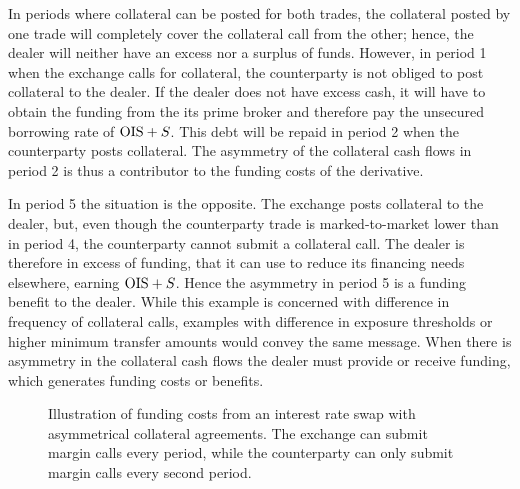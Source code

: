 \documentclass[main.tex]{subfiles}
\begin{document}
        In periods where collateral can be posted for both trades, 
        the collateral posted by one trade will completely cover the collateral call from the other;
        hence, the dealer will neither have an excess nor a surplus of funds.
        However, in period 1 when the exchange calls for collateral,
        the counterparty is not obliged to post collateral to the dealer. 
        If the dealer does not have excess cash, 
        it will have to obtain the funding from the its prime broker 
        and therefore pay the unsecured borrowing rate of $\OIS/ + S$. 
        This debt will be repaid in period 2 when the counterparty posts collateral.
        The asymmetry of the collateral cash flows in period 2
        is thus a contributor to the funding costs of the derivative.

        In period 5 the situation is the opposite.
        The exchange posts collateral to the dealer, 
        but, even though the counterparty trade is marked-to-market lower than in period 4,
        the counterparty cannot submit a collateral call. 
        The dealer is therefore in excess of funding,
        that it can use to reduce its financing needs elsewhere, earning $\OIS/ + S$.
        Hence the asymmetry in period 5 is a funding benefit to the dealer.
        While this example is concerned with difference in frequency of collateral calls,
        examples with difference in exposure thresholds or higher minimum transfer amounts 
        would convey the same message.
        When there is asymmetry in the collateral cash flows the dealer must provide or receive funding,
        which generates funding costs or benefits.

        \begin{figure}
            \centering
            \resizebox{\textwidth}{!}{%
            \begin{tikzpicture}
                
            \end{tikzpicture}        
            }   
            \caption{
                Illustration of funding costs from an interest rate swap with asymmetrical collateral agreements.
                The exchange can submit margin calls every period,
                while the counterparty can only submit margin calls every second period.
            }
            \label{fig:funding-costs-asymmetrical-csa}
        \end{figure}
\end{document}
